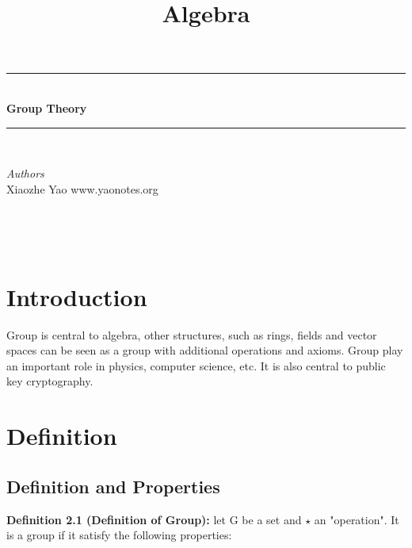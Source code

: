 \documentclass[12pt,openany]{book}
\title{Algebra}
\theoremstyle{definition}
\theoremstyle{definition}
\newcommand{\HRule}{\rule{\linewidth}{0.5mm}} %
\begin{document}
 

\begin{center}
\HRule \\[0.4cm]
{ \huge \bfseries Group Theory}\\[0.4cm] %
\HRule \\[1.5cm]
\begin{minipage}{0.4\textwidth}
\begin{flushleft} \large
\emph{Authors}\\
Xiaozhe Yao \newline
www.yaonotes.org \newline

\end{flushleft}
\end{minipage}
~
\begin{minipage}{0.4\textwidth}
\begin{flushright} \large

\end{flushright}
\end{minipage}\\[0.5cm]
\end{center}

\chapter{Introduction}

Group is central to algebra, other structures, such as rings, fields and vector spaces can be seen as a group with additional operations and axioms. Group play an important role in physics, computer science, etc. It is also central to public key cryptography.

\chapter{Definition}

\section{Definition and Properties}

\noindent\textbf{Definition 2.1 (Definition of Group):} let G be a set and $\star$ an "operation". It is a group if it satisfy the following properties:
\end{document}
